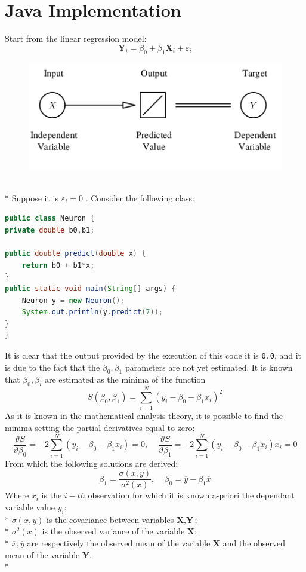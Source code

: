 \documentclass[10pt,a4paper]{article}
\begin{document}
	\section{Java Implementation}
	Start from the linear regression model:
	$$
	\textbf{Y}_i = \beta_0 + \beta_1 \textbf{X}_i + \varepsilon_i
	$$
	\begin{figure}[h!]
		\centering
		\includegraphics[scale=2]{img/linreg}
	\end{figure}\\*
	Suppose it is $\varepsilon_i = 0$ . Consider the following class:
	\begin{lstlisting}[language=Java]
public class Neuron {
private double b0,b1;
	
public double predict(double x) {
	return b0 + b1*x;
}
public static void main(String[] args) {
	Neuron y = new Neuron();
	System.out.println(y.predict(7));
}
}
	\end{lstlisting}
	It is clear that the output provided by the execution of this code it is \texttt{0.0}, and it is due to the fact that the $\beta_0,\beta_1$ parameters are not yet estimated. It is known that $\beta_0,\beta_i$ are estimated as the minima of the function
	$$
	S(\beta_0,\beta_1) = \sum_{i=1}^N (y_i - \beta_0 - \beta_1 x_i)^2
	$$
	As it is known in the mathematical analysis theory, it is possible to find the minima setting the partial derivatives equal to zero:
	$$
	\frac{\vartheta S}{\vartheta \beta_0} = -2 \sum_{i=1}^N (y_i - \beta_0 - \beta_1x_i) = 0,\;\;\;\;
	\frac{\vartheta S}{\vartheta \beta_1} = -2 \sum_{i=1}^N (y_i - \beta_0 - \beta_1 x_i) x_i = 0
	$$
	From which the following solutions are derived:
	$$
	\beta_1 = \frac{\sigma(x,y)}{\sigma^2(x)},\;\;\;\;
	\beta_0 = \overline y - \beta_1 \overline x
	$$
	Where $ x_i$ is the $i-th$ observation for which it is known a-priori the dependant variable value $y_i$;\\* $\sigma(x,y)$ is the covariance between variables $\textbf{X},\textbf{Y}$;\\* $\sigma^2(x)$ is the observed variance of the variable $\textbf{X}$;\\* $\overline x, \overline y$ are respectively the observed mean of the variable $\textbf{X}$ and the observed mean of the variable $\textbf{Y}$.\\*
\end{document}
